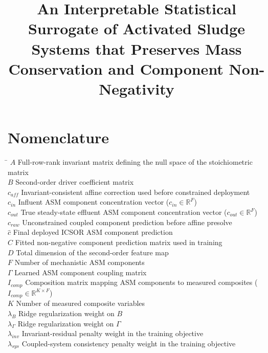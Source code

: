 \documentclass[11pt]{article}
\begin{document}
\linenumbers

\title{An Interpretable Statistical Surrogate of Activated Sludge Systems that Preserves Mass Conservation and Component Non-Negativity}
\author{}

\maketitle

\section*{Nomenclature}
\begin{tabbing}
\hspace{2.5cm} \= \kill
$A$ \> Full-row-rank invariant matrix defining the null space of the stoichiometric matrix \\
$B$ \> Second-order driver coefficient matrix \\
$c_{aff}$ \> Invariant-consistent affine correction used before constrained deployment \\
$c_{in}$ \> Influent ASM component concentration vector ($c_{in} \in \mathbb{R}^{F}$) \\
$c_{out}$ \> True steady-state effluent ASM component concentration vector ($c_{out} \in \mathbb{R}^{F}$) \\
$c_{raw}$ \> Unconstrained coupled component prediction before affine presolve \\
$\hat{c}$ \> Final deployed ICSOR ASM component prediction \\
$\widehat{C}$ \> Fitted non-negative component prediction matrix used in training \\
$D$ \> Total dimension of the second-order feature map \\
$F$ \> Number of mechanistic ASM components \\
$\Gamma$ \> Learned ASM component coupling matrix \\
$I_{comp}$ \> Composition matrix mapping ASM components to measured composites ($I_{comp} \in \mathbb{R}^{K \times F}$) \\
$K$ \> Number of measured composite variables \\
$\lambda_B$ \> Ridge regularization weight on $B$ \\
$\lambda_\Gamma$ \> Ridge regularization weight on $\Gamma$ \\
$\lambda_{inv}$ \> Invariant-residual penalty weight in the training objective \\
$\lambda_{sys}$ \> Coupled-system consistency penalty weight in the training objective \\

\end{tabbing}
\end{document}
